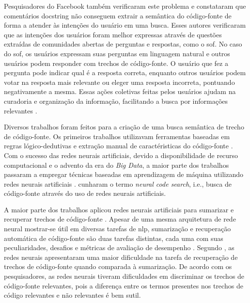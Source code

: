 Pesquisadores do Facebook \citep{cambronero-deep-learning-code-search:2019} também verificaram este problema e constataram que comentários \gls{docstring} não conseguem extrair a semântica do código-fonte de forma a atender às intenções do usuário em uma busca. Esses autores verificaram que as intenções dos usuários foram melhor expressas através de questões extraídas de comunidades abertas de perguntas e respostas, como o \gls{sof}. No caso do \Gls{sof}, os usuários expressam suas perguntas em linguagem natural e outros usuários podem responder com trechos de código-fonte. O usuário que fez a pergunta pode indicar qual é a resposta correta, enquanto outros usuários podem votar na resposta mais relevante ou eleger uma resposta incorreta, pontuando negativamente a mesma. Essas ações coletivas feitas pelos usuários ajudam na curadoria e organização da informação, facilitando a busca por informações relevantes \citep{Wang-quora:2013, cambronero-deep-learning-code-search:2019}. 


Diversos trabalhos foram feitos para a criação de uma busca semântica de trecho de código-fonte. Os primeiros trabalhos utilizavam ferramentas baseadas em regras lógico-dedutivas e extração manual de caractéristicas do código-fonte \citep{Allamanis:2018:SML}. Com o sucesso das redes neurais artificiais, devido a disponibilidade de recurso computacional e o advento da era do \textit{Big Data}, a maior parte dos trabalhos passaram a empregar técnicas baseadas em aprendizagem de máquina utilizando redes neurais artificiais \citep{Gu-deep-code-search:2018, yao-2018, iyer-etal-2016-summarizing, Allamanis-bimodal-source-code-natural-language:2015, Chen-bi-variational-autoencoder:2018, Sachdev-neural-code-search:2018, cambronero-deep-learning-code-search:2019}. \cite{cambronero-deep-learning-code-search:2019} cunharam o termo \textit{neural code search}, i.e., busca de código-fonte através do uso de redes neurais artificiais.

A maior parte dos trabalhos aplicou redes neurais artificiais para sumarizar e recuperar trechos de código-fonte \citep{iyer-etal-2016-summarizing, Allamanis-bimodal-source-code-natural-language:2015, Chen-bi-variational-autoencoder:2018}. Apesar de uma mesma arquitetura de rede neural mostrar-se 
útil em diversas tarefas de \acrfull{nlp}, sumarização e recuperação automática de código-fonte são duas tarefas distintas, cada uma com suas peculiaridades, desafios e métricas de avaliação de desempenho \citep{allahyari-text-summarization-2017}. Segundo \cite{Allamanis-bimodal-source-code-natural-language:2015}, as redes neurais apresentaram uma maior dificuldade na tarefa de recuperação de trechos de código-fonte quando comparada à sumarização. De acordo com os pesquisadores, as redes neurais tiveram dificuldades em discriminar os trechos de código-fonte relevantes, pois a diferença entre os termos presentes nos trechos de código relevantes e não relevantes é bem sutil.

